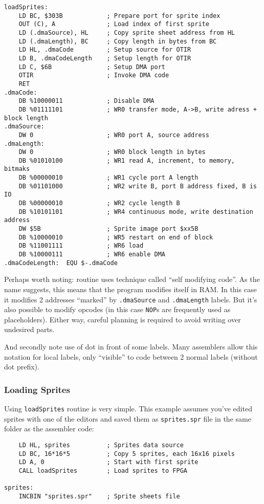 \documentclass[12pt,twoside,openright,a4paper]{book}
\begin{document}
\begin{Verbatim}
loadSprites:
	LD BC, $303B            ; Prepare port for sprite index
	OUT (C), A              ; Load index of first sprite
	LD (.dmaSource), HL     ; Copy sprite sheet address from HL
	LD (.dmaLength), BC     ; Copy length in bytes from BC
	LD HL, .dmaCode         ; Setup source for OTIR
	LD B, .dmaCodeLength    ; Setup length for OTIR
	LD C, $6B               ; Setup DMA port
	OTIR                    ; Invoke DMA code
	RET
.dmaCode:
	DB %10000011            ; Disable DMA
	DB %01111101            ; WR0 transfer mode, A->B, write adress + block length
.dmaSource:
	DW 0                    ; WR0 port A, source address
.dmaLength:
	DW 0                    ; WR0 block length in bytes
	DB %01010100            ; WR1 read A, increment, to memory, bitmaks
	DB %00000010            ; WR1 cycle port A length
	DB %01101000            ; WR2 write B, port B address fixed, B is IO
	DB %00000010            ; WR2 cycle length B
	DB %10101101            ; WR4 continuous mode, write destination address
	DW $5B                  ; Sprite image port $xx5B
	DB %10000010            ; WR5 restart on end of block
	DB %11001111            ; WR6 load
	DB %10000111            ; WR6 enable DMA
.dmaCodeLength:  EQU $-.dmaCode
\end{Verbatim}

Perhaps worth noting: routine uses technique called ``self modifying code''. As the name suggests, this means that the program modifies itself in RAM. In this case it modifies 2 addresses ``marked'' by {\tt .dmaSource} and {\tt .dmaLength} labels. But it's also possible to modify opcodes (in this case {\tt NOP}s are frequently used as placeholders). Either way, careful planning is required to avoid writing over undesired parts.

And secondly note use of dot in front of some labels. Many assemblers allow this notation for local labels, only ``visible'' to code between 2 normal labels (without dot prefix).


\pagebreak
\subsubsection{Loading Sprites}

Using {\tt loadSprites} routine is very simple. This example assumes you've edited sprites with one of the editors and saved them as {\tt sprites.spr} file in the same folder as the assembler code:

\begin{Verbatim}
	LD HL, sprites          ; Sprites data source
	LD BC, 16*16*5          ; Copy 5 sprites, each 16x16 pixels
	LD A, 0                 ; Start with first sprite
	CALL loadSprites        ; Load sprites to FPGA

sprites:
	INCBIN "sprites.spr"    ; Sprite sheets file
\end{Verbatim}
\end{document}
